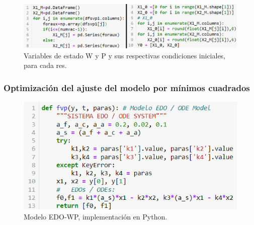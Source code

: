 \begin{enumerate}
        \begin{figure}[H]
            \centering
            \includegraphics[scale = 0.56]{img/x1x2einit.png}
            \caption{Variables de estado W y P y sus respectivas condiciones iniciales, para cada res.}
            \label{x1x2einitpng}
        \end{figure}
\end{enumerate}

\subsubsection{Optimización del ajuste del modelo por mínimos cuadrados}

        \begin{figure}[H]
            \centering
            \includegraphics[scale=0.7]{img/modEDOpython.png}
            \caption{Modelo EDO-WP, implementación en Python.}
            \label{modEDOpythonpng}
        \end{figure}


